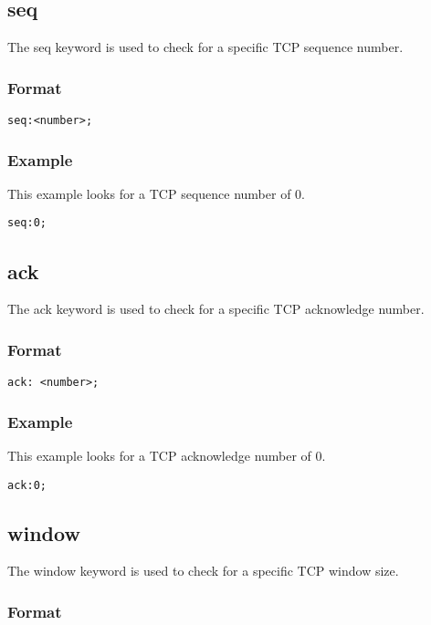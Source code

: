 \documentclass[english]{report}
\begin{document}
\subsection{seq}

The seq keyword is used to check for a specific TCP sequence number.

\subsubsection{Format}
\begin{verbatim}
seq:<number>;
\end{verbatim}

\subsubsection{Example}
This example looks for a TCP sequence number of 0.

\begin{verbatim}
seq:0;
\end{verbatim}


\subsection{ack}

The ack keyword is used to check for a specific TCP acknowledge number.

\subsubsection{Format}
\begin{verbatim}
ack: <number>;
\end{verbatim}

\subsubsection{Example}
This example looks for a TCP acknowledge number of 0.
\begin{verbatim}
ack:0;
\end{verbatim}

\subsection{window}

The window keyword is used to check for a specific TCP window size.

\subsubsection{Format}
\end{document}
